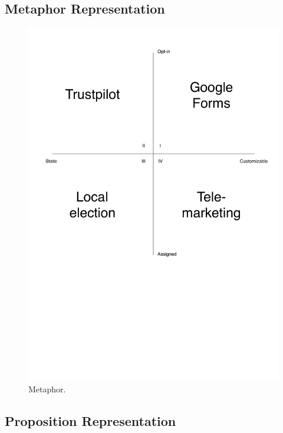 \subsection{Metaphor Representation}
\label{sub:metaphor_representation}

\begin{figure}[!htbp]
    \centering
    \includegraphics[width=\textwidth]{graphic/problem_analysis/vision/metaphor.pdf}
    \caption{Metaphor.}
    \label{fig:metaphor}
\end{figure}
\FloatBarrier

\subsection{Proposition Representation}
\label{sub:proposition_representation}

